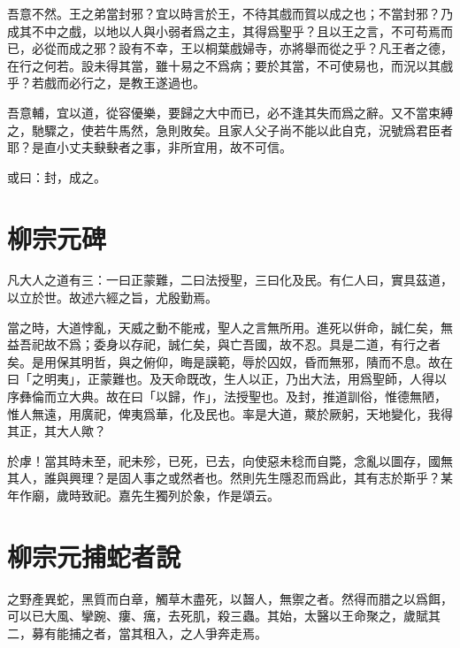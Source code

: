 吾意不然。王之弟當封邪？宜以時言於王，不待其戲而賀以成之也；不當封邪？乃成其不中之戲，以地以人與小弱者爲之主，其得爲聖乎？且以王之言，不可苟焉而已，必從而成之邪？設有不幸，王以桐葉戲婦寺，亦將舉而從之乎？凡王者之德，在行之何若。設未得其當，雖十易之不爲病；要於其當，不可使易也，而況以其戲乎？若戲而必行之，是教王遂過也。

吾意輔，宜以道，從容優樂，要歸之大中而已，必不逢其失而爲之辭。又不當束縛之，馳驟之，使若牛馬然，急則敗矣。且家人父子尚不能以此自克，況號爲君臣者耶？是直小丈夫𡙇𡙇者之事，非所宜用，故不可信。

或曰：封，成之。

\section[箕子碑\quad{\small 柳宗元}]{{\normalsize 柳宗元}\quad {}碑}
凡大人之道有三：一曰正蒙難，二曰法授聖，三曰化及民。有仁人曰，實具茲道，以立於世。故述六經之旨，尤殷勤焉。

當之時，大道悖亂，天威之動不能戒，聖人之言無所用。進死以倂命，誠仁矣，無益吾祀故不爲；委身以存祀，誠仁矣，與亡吾國，故不忍。具是二道，有行之者矣。是用保其明哲，與之俯仰，晦是謨範，辱於囚奴，昏而無邪，隤而不息。故在曰「之明夷」，正蒙難也。及天命既改，生人以正，乃出大法，用爲聖師，人得以序彝倫而立大典。故在曰「以歸，作」，法授聖也。及封，推道訓俗，惟德無陋，惟人無遠，用廣祀，俾夷爲華，化及民也。率是大道，藂於厥躬，天地變化，我得其正，其大人歟？

於虖！當其時未至，祀未殄，已死，已去，向使惡未稔而自斃，念亂以圖存，國無其人，誰與興理？是固人事之或然者也。然則先生隱忍而爲此，其有志於斯乎？某年作廟，歲時致祀。嘉先生獨列於象，作是頌云。


\section[捕蛇者說\quad{\small 柳宗元}]{{\normalsize 柳宗元}\quad 捕蛇者說}
之野產異蛇，黑質而白章，觸草木盡死，以齧人，無禦之者。然得而腊之以爲餌，可以已大風、攣踠、瘻、癘，去死肌，殺三蟲。其始，太醫以王命聚之，歲賦其二，募有能捕之者，當其租入，之人爭奔走焉。

